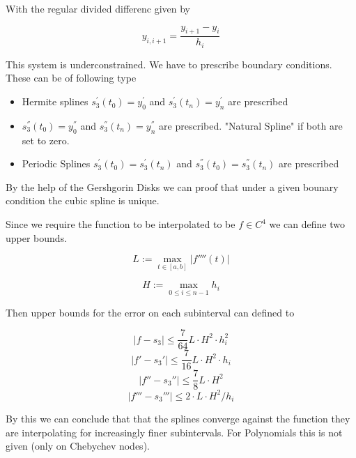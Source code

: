 \documentclass[
    a4paper,
    11pt
]{article}
\begin{document}
With the regular divided differenc given by

\begin{equation}
    y_{i, i+1} = \frac{y_{i+1} - y_i}{h_{i}}
\end{equation}

This system is underconstrained. We have to prescribe boundary conditions. These
can be of following type

\begin{itemize}
    \item Hermite splines $s_3^{'}(t_0) = y_0^{'}$ and $s_3^{'}(t_n) = y_n^{'}$ are
        prescribed
    \item $s_3^{''}(t_0) = y_0^{''}$ and $s_3^{''}(t_n) = y_n^{''}$ are
        prescribed. "Natural Spline" if both are set to zero.
    \item Periodic Splines $s_3^{'}(t_0) = s_3^{'}(t_n)$ and $s_3^{''}(t_0) =
        s_3^{''}(t_n)$ are prescribed
\end{itemize}

By the help of the Gershgorin Disks we can proof that under a given bounary
condition the cubic spline is unique.

Since we require the function to be interpolated to be $f \in \mathit{C}^4$ we
can define two upper bounds.

\begin{equation}
    L := \max_{t \in [a,b]} | f''''(t)|
\end{equation}

\begin{equation}
    H := \max_{0 \leq i \leq n-1} h_i
\end{equation}

Then upper bounds for the error on each subinterval can defined to

\begin{equation}
    |f - s_3| \leq \frac{7}{64} L \cdot H^2 \cdot h_i^2
\end{equation}
\begin{equation}
    |f' - s_3'| \leq \frac{7}{16} L \cdot H^2 \cdot h_i
\end{equation}
\begin{equation}
    |f'' - s_3''| \leq \frac{7}{8} L \cdot H^2 
\end{equation}
\begin{equation}
    |f''' - s_3'''| \leq 2 \cdot L \cdot H^2 / h_i
\end{equation}

By this we can conclude that that the splines converge against the function they
are interpolating for increasingly finer subintervals. For Polynomials this is
not given (only on Chebychev nodes).
\end{document}
